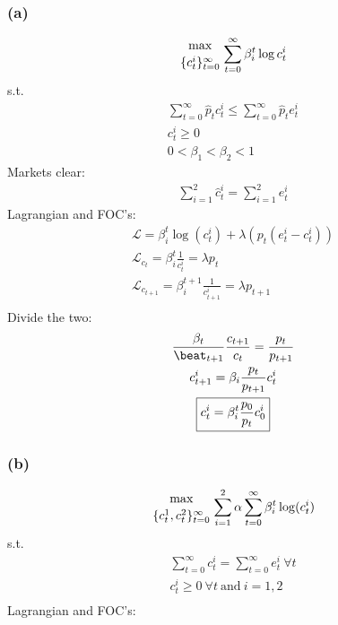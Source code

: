 \documentclass[10pt, a4paper]{article}
\begin{document}
    \subsubsection*{(a)}
      \begin{gather*}
        {\max\atop{\{c_t^i\}_{t=0}^{\infty}}}\sum\limits_{t=0}^{\infty}\beta_i^t\log{c_t^i}
      \end{gather*}
      s.t.
      \begin{gather*}
        \sum\limits_{t=0}^{\infty}\hat{p}_tc_t^i \leq\sum\limits_{t=0}^{\infty}\hat{p}_te_t^i \\
        c_t^i\geq0 \\
        0<\beta_1<\beta_2<1
      \end{gather*}
      Markets clear:
      \begin{gather*}
        \sum\limits_{i=1}^2\hat{c}_t^i = \sum\limits_{i=1}^2e_t^i
      \end{gather*}
      Lagrangian and FOC's:
      \begin{gather*}
        \mathcal{L} = \beta_i^t\log(c_t^i) + \lambda(p_t(e_t^i-c_t^i)) \\
        \mathcal{L}_{c_t} = \beta_i^t\frac{1}{c_t^i} = \lambda p_t \\
        \mathcal{L}_{c_{t+1}} = \beta_i^{t+1}\frac{1}{c_{t+1}^i} = \lambda p_{t+1} \\
      \end{gather*}
      Divide the two:
      \begin{gather*}
        \frac{\beta_t}{\beat_{t+1}} \frac{c_{t+1}}{c_t} = \frac{p_t}{p_{t+1}} \\
        c_{t+1}^i = \beta_i\frac{p_t}{p_{t+1}}c_t^i \\
        \boxed{c_{t}^i = \beta^t_i\frac{p_0}{p_{t}}c^i_0}
      \end{gather*}
    \subsubsection*{(b)}
      \begin{gather*}
        {\max\atop{\{c_t^1,c_t^2\}_{t=0}^{\infty}}} \sum\limits_{i=1}^{2}\alpha\sum\limits_{t=0}^{\infty}\beta_i^t\log(c_t^i) \\
      \end{gather*}
      s.t.
      \begin{gather*}
        \sum\limits_{t=0}^{\infty}c_t^i = \sum\limits_{t=0}^{\infty}e_t^i \ \forall t\\
        c_t^i \geq 0 \ \forall t \ \text{and} \ i = 1,2 \\
      \end{gather*}
      Lagrangian and FOC's:
\end{document}
